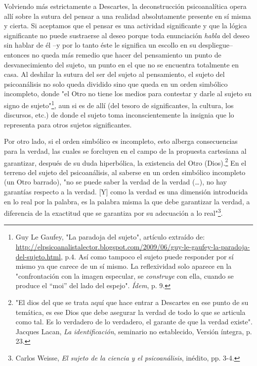 \documentclass{book}
\begin{document}
Volviendo más estrictamente a Descartes, la deconstrucción
psicoanalítica opera allí sobre la sutura del pensar a una realidad
absolutamente presente en sí misma y cierta. Si aceptamos que el pensar
es una actividad significante y que la lógica significante no puede
sustraerse al deseo porque toda enunciación \emph{habla} del deseo sin
hablar de él --y por lo tanto éste le significa un escollo en su
despliegue-- entonces no queda más remedio que hacer del pensamiento un
punto de desvanecimiento del sujeto, un punto en el que no se encuentra
totalmente en casa. Al deshilar la sutura del ser del sujeto al
pensamiento, el sujeto del psicoanálisis no solo queda dividido sino que
queda en un orden simbólico incompleto, donde "el Otro no tiene los
medios para contestar y darle al sujeto su signo de sujeto"\footnote{Guy
  Le Gaufey, "La paradoja del sujeto", artículo extraído de:
  \url{http://elpsicoanalistalector.blogspot.com/2009/06/guy-le-gaufey-la-paradoja-del-sujeto.html},
  p.4. Así como tampoco el sujeto puede responder por sí mismo ya que
  carece de un sí mismo. La reflexividad solo aparece en la
  "confrontación con la imagen especular, se \emph{construye} con ella,
  cuando se produce el ``moi'' del lado del espejo". \emph{Ídem}, p. 9.},
aun si es de allí (del tesoro de significantes, la cultura, los
discursos, etc.) de donde el sujeto toma inconscientemente la insignia
que lo representa para otros sujetos significantes.

Por otro lado, si el orden simbólico es incompleto, esto alberga
consecuencias para la verdad, las cuales se forcluyen en el campo de la
propuesta cartesiana al garantizar, después de su duda hiperbólica, la
existencia del Otro (Dios).\footnote{"El dios del que se trata aquí que
  hace entrar a Descartes en ese punto de su temática, es ese Dios que
  debe asegurar la verdad de todo lo que se articula como tal. Es lo
  verdadero de lo verdadero, el garante de que la verdad existe".
  Jacques Lacan, \emph{La identificación}, seminario no establecido,
  Versión íntegra, p. 23.} En el terreno del sujeto del psicoanálisis,
al saberse en un orden simbólico incompleto (un Otro barrado), "no se
puede saber la verdad de la verdad (\ldots), no hay garantías respecto a
la verdad. {[}Y{]} como la verdad es una dimensión introducida en lo
real por la palabra, es la palabra misma la que debe garantizar la
verdad, a diferencia de la exactitud que se garantiza por su adecuación
a lo real"\footnote{Carlos Weisse, \emph{El sujeto de la ciencia y el
  psicoanálisis}, inédito, pp. 3-4.}.
\end{document}
